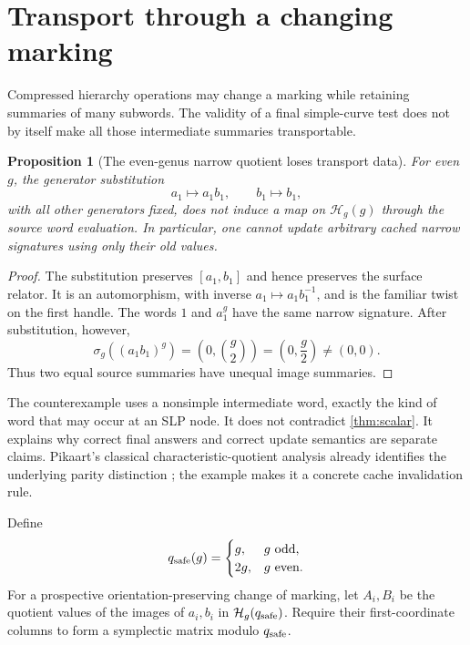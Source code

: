 \documentclass[11pt,letterpaper]{article}
\newtheorem{proposition}[proposition]{Proposition}
\theoremstyle{definition}
\theoremstyle{remark}
\newcommand{\HH}{\mathcal H}
\newcommand{\sig}{\sigma}
\begin{document}
\section{Transport through a changing marking}
\label{sec:transport}
Compressed hierarchy operations may change a marking while retaining summaries of many subwords. The validity of a final simple-curve test does not by itself make all those intermediate summaries transportable.

\begin{proposition}[The even-genus narrow quotient loses transport data]\label{prop:failure}
For even $g$, the generator substitution
\[
 a_1\longmapsto a_1b_1,\qquad b_1\longmapsto b_1,
\]
with all other generators fixed, does not induce a map on $\HH_g(g)$ through the source word evaluation. In particular, one cannot update arbitrary cached narrow signatures using only their old values.
\end{proposition}
\begin{proof}
The substitution preserves $[a_1,b_1]$ and hence preserves the surface relator. It is an automorphism, with inverse $a_1\mapsto a_1b_1^{-1}$, and is the familiar twist on the first handle. The words $1$ and $a_1^g$ have the same narrow signature. After substitution, however,
\[
 \sig_g((a_1b_1)^g)
 =\left(0,\binom g2\right)
 =\left(0,\frac g2\right)\ne(0,0).
\]
Thus two equal source summaries have unequal image summaries.
\end{proof}

The counterexample uses a nonsimple intermediate word, exactly the kind of word that may occur at an SLP node. It does not contradict \cref{thm:scalar}. It explains why correct final answers and correct update semantics are separate claims. Pikaart's classical characteristic-quotient analysis already identifies the underlying parity distinction \cite{pikaart}; the example makes it a concrete cache invalidation rule.

Define
\[
 q_{\rm safe}(g)=\begin{cases}g,&g\text{ odd},\\2g,&g\text{ even}.\end{cases}
\]
For a prospective orientation-preserving change of marking, let $A_i,B_i$ be the quotient values of the images of $a_i,b_i$ in $\HH_g(q_{\rm safe})$. Require their first-coordinate columns to form a symplectic matrix modulo $q_{\rm safe}$.
\end{document}
